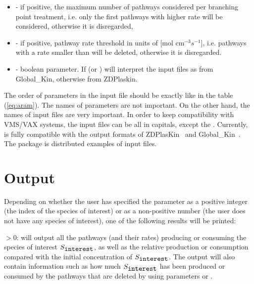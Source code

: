 \begin{description}
\begin{itemize}
\item{ - if positive, the maximum number of pathways considered per branching point treatment, i.e. only the first  pathways with higher rate will be considered, otherwise it is disregarded,}
\item{ - if positive, pathway rate threshold in units of [mol cm$^{-3}$$s^{-1}$], i.e. pathways with a rate smaller than  will be deleted, otherwise it is disregarded.}
\item{ - boolean parameter. If  (or )} \pump{} will interpret the input files as from Global\_Kin, otherwise from ZDPlaskin.
\end{itemize}
\end{description}

The order of parameters in the input file should be exactly like in the table (\ref{eq:aram}). The names of parameters are not important. On the other hand, the names of input files are very important. In order to keep compatibility with VMS/VAX systems, the input files can be all in capitals, except the . Currently, \pump{} 
is fully compatible with the output formats of ZDPlasKin~\cite{Zdplaskin,Flitti2009/EPJAP,Qtplaskin} and Global\_Kin~\cite{Dorai2002/JPD, Dorai2003/JPhD/1}.  The \pump{} package 
is distributed examples of input files. 


\section{Output}
\label{sec_3_2}

Depending on whether the user has specified the  parameter as a positive integer (the index of the species of interest) or as a non-positive number (the user does not have any species of interest), one of the following results will be printed:

 $> 0$: \pump{} will output all the pathways (and their rates) producing or consuming the species of interest $S_{\verb"interest"}$, as well as the relative production or consumption compared with the initial concentration of $S_{\verb"interest"}$. The output will also contain information such as how much $S_{\verb"interest"}$ has been produced or consumed by the pathways that are deleted by \pump{} using parameters  or . 

